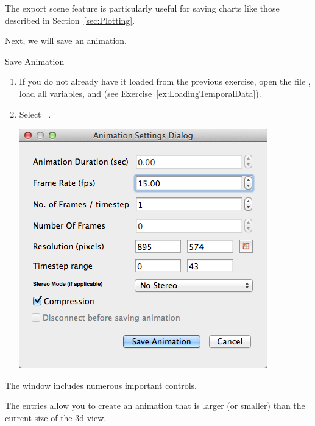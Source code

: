 The export scene feature is particularly useful for saving charts like
those described in Section~\ref{sec:Plotting}.



Next, we will save an animation.

\begin{exercise}{Save Animation}
  \label{ex:SaveAnimation}%
  \begin{enumerate}
  \item If you do not already have it loaded from the previous exercise,
    open the file , load all variables, and \apply (see
    Exercise~\ref{ex:LoadingTemporalData}).

  \item Select  \ra {}~.

  \begin{inlinefig}
    \includegraphics[width=0.8\scw]{images/SaveAnimation1}
  \end{inlinefig}

  \savecounter
  \end{enumerate}

  The  window includes numerous important controls.  
  
  The  entries allow you to
  create an animation that is larger (or smaller) than the current size of
  the 3d view. 


\end{exercise}
